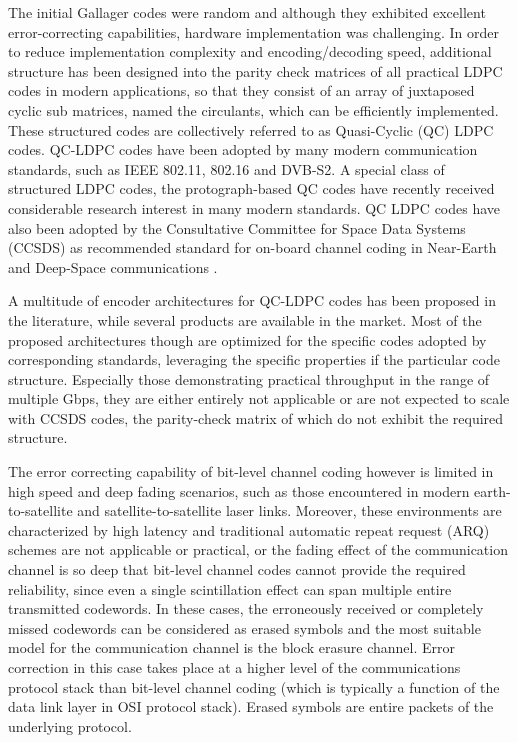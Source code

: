 The initial Gallager codes were random and although they exhibited excellent error-correcting capabilities, hardware implementation was challenging. In order to reduce implementation complexity and encoding/decoding speed, additional structure has been designed into the parity check matrices of all practical LDPC codes in modern applications, so that they consist of an array of juxtaposed cyclic sub matrices, named the circulants, which can be efficiently implemented. These structured codes are collectively referred to as Quasi-Cyclic (QC) LDPC codes. QC-LDPC codes have been adopted by many modern communication standards, such as IEEE 802.11, 802.16 and DVB-S2. A special class of structured LDPC codes, the protograph-based QC codes have recently received considerable research interest in many modern standards. QC LDPC codes have also been adopted by the Consultative Committee for Space Data Systems (CCSDS) as recommended standard for on-board channel coding in Near-Earth and Deep-Space communications \cite{CCSDS131.0}.\par
A multitude of encoder architectures for QC-LDPC codes has been proposed in the literature, while several products are available in the market. Most of the proposed architectures though are optimized for the specific codes adopted by corresponding standards, leveraging the specific properties if the particular code structure. Especially those demonstrating practical throughput in the range of multiple Gbps, they are either entirely not applicable or are not expected to scale with CCSDS codes, the parity-check matrix of which do not exhibit the required structure.\par

The error correcting capability of bit-level channel coding however is limited in high speed and deep fading scenarios, such as those encountered in modern earth-to-satellite and satellite-to-satellite laser links. Moreover, these environments are characterized by high latency and traditional automatic repeat request (ARQ) schemes are not applicable or practical, or the fading effect of the communication channel is so deep that bit-level channel codes cannot provide the required reliability, since even a single scintillation effect can span multiple entire transmitted codewords. In these cases, the erroneously received or completely missed codewords can be considered as erased symbols and the most suitable model for the communication channel is the block erasure channel. Error correction in this case takes place at a higher level of the communications protocol stack than bit-level channel coding (which is typically a function of the data link layer in OSI protocol stack). Erased symbols are entire packets of the underlying protocol.\par

